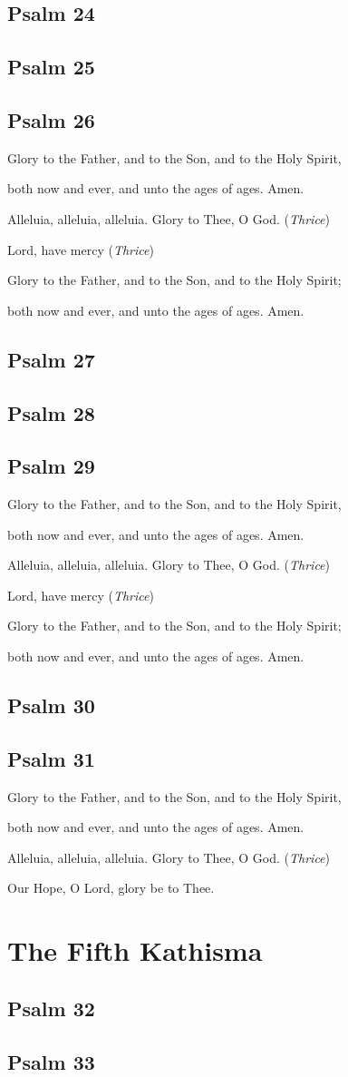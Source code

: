 \documentclass[12pt,openany]{book}
\newcommand{\kathismabreak}{
  \medskip
  \begin{center}
  \begin{footnotesize}
  Glory to the Father, and to the Son, and to the Holy Spirit,
  
  both now and ever, and unto the ages of ages. Amen.

  Alleluia, alleluia, alleluia. Glory to Thee, O God. (\textit{Thrice})

  Lord, have mercy (\textit{Thrice})

  Glory to the Father, and to the Son, and to the Holy Spirit;
  
  both now and ever, and unto the ages of ages. Amen.
  \end{footnotesize}
  \end{center}
  \smallbreak
}
\newcommand{\kathismaend}{
  \medskip
  \begin{center}
  \begin{footnotesize}
  Glory to the Father, and to the Son, and to the Holy Spirit,
  
  both now and ever, and unto the ages of ages. Amen.

  Alleluia, alleluia, alleluia. Glory to Thee, O God. (\textit{Thrice})

  Our Hope, O Lord, glory be to Thee.
  \end{footnotesize}
  \end{center}
  \smallbreak
}
\begin{document}
\section{Psalm 24}

\smallskip
\section{Psalm 25}

\smallskip
\section{Psalm 26}


\kathismabreak
\smallskip

\section{Psalm 27}

\medskip
\section{Psalm 28}

\medskip
\section{Psalm 29}

\smallbreak

\pagebreak %
\kathismabreak
\smallskip

\section{Psalm 30}

\smallskip
\section{Psalm 31}


\kathismaend

\chapter*{The Fifth Kathisma}
\smallskip
\section{Psalm 32}

\smallskip
\section{Psalm 33}

\end{document}
